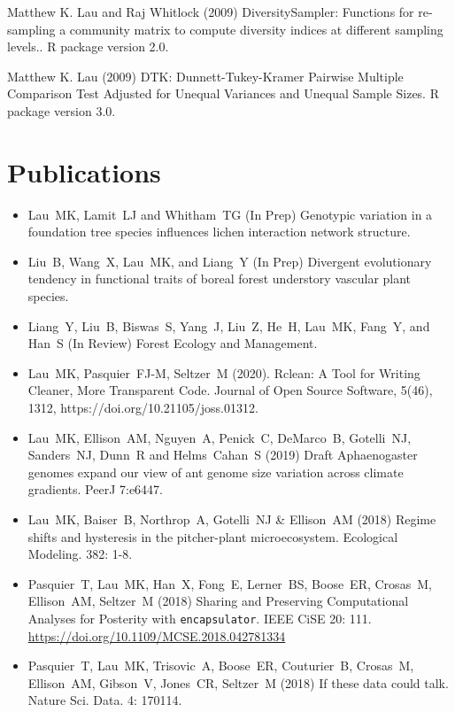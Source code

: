 \documentclass[a4paper]{article}
\begin{document}
{Matthew K. Lau and Raj Whitlock (2009) DiversitySampler: Functions
  for re-sampling a community matrix to compute diversity indices at
  different sampling levels.. R package version 2.0.}

{Matthew K. Lau (2009) DTK: Dunnett-Tukey-Kramer Pairwise Multiple
Comparison Test Adjusted for Unequal Variances and Unequal Sample Sizes.
R package version 3.0.}

\section{Publications}\label{publications}

\begin{itemize}

\item Lau~MK, Lamit~LJ and Whitham~TG (In Prep) Genotypic variation in
  a foundation tree species influences lichen interaction network
  structure. 
\item Liu~B, Wang~X, Lau~MK, and Liang~Y (In Prep) Divergent
  evolutionary tendency in functional traits of boreal forest
  understory vascular plant species.
\item Liang~Y, Liu~B, Biswas~S, Yang~J, Liu~Z, He~H, Lau~MK, Fang~Y, and
  Han~S (In Review) Forest Ecology and Management.
\item Lau~MK, Pasquier~FJ-M, Seltzer~M (2020). Rclean: A Tool for
  Writing Cleaner, More Transparent Code. Journal of Open Source
  Software, 5(46), 1312, https://doi.org/10.21105/joss.01312.
\item 
  Lau~MK, Ellison~AM, Nguyen~A, Penick~C, DeMarco~B, Gotelli~NJ,
  Sanders~NJ, Dunn~R and Helms~Cahan~S (2019) Draft Aphaenogaster
  genomes expand our view of ant genome size variation across climate
  gradients. PeerJ 7:e6447. 
\item 
  Lau~MK, Baiser~B, Northrop~A, Gotelli~NJ \& Ellison~AM (2018) Regime
  shifts and hysteresis in the pitcher-plant
  microecosystem. Ecological Modeling. 382: 1-8.
\item 
  Pasquier~T, Lau~MK, Han~X, Fong~E, Lerner~BS, Boose~ER, Crosas~M,
  Ellison~AM, Seltzer~M (2018) Sharing and Preserving Computational
  Analyses for Posterity with \texttt{encapsulator}. IEEE CiSE 20:
  111. \href{https://doi.org/10.1109/MCSE.2018.042781334}{https://doi.org/10.1109/MCSE.2018.042781334}
\item 
  Pasquier~T, Lau~MK, Trisovic~A, Boose~ER, Couturier~B, Crosas~M,
  Ellison~AM, Gibson~V, Jones~CR, Seltzer~M (2018) If these data could
  talk. Nature Sci. Data. 4: 170114.

\end{itemize}
\end{document}
